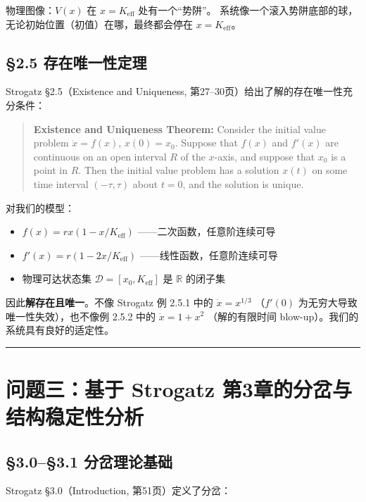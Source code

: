 \documentclass[12pt,a4paper]{article}
\begin{document}
物理图像：$V(x)$ 在 $x = K_{\text{eff}}$ 处有一个``势阱''。
系统像一个滚入势阱底部的球，无论初始位置（初值）在哪，最终都会停在 $x = K_{\text{eff}}$。

\subsection{\S2.5 存在唯一性定理}

Strogatz \S2.5（Existence and Uniqueness, 第27--30页）给出了解的存在唯一性充分条件：

\begin{quote}
\small
\textbf{Existence and Uniqueness Theorem:} Consider the initial value problem $\dot{x} = f(x)$,
$x(0) = x_0$. Suppose that $f(x)$ and $f'(x)$ are continuous on an open interval $R$ of the
$x$-axis, and suppose that $x_0$ is a point in $R$. Then the initial value problem has a
solution $x(t)$ on some time interval $(-\tau, \tau)$ about $t = 0$, and the solution is unique.
\end{quote}

对我们的模型：
\begin{itemize}
  \item $f(x) = r x(1 - x/K_{\text{eff}})$ ——二次函数，任意阶连续可导
  \item $f'(x) = r(1 - 2x/K_{\text{eff}})$ ——线性函数，任意阶连续可导
  \item 物理可达状态集 $\mathcal{D} = [x_0, K_{\text{eff}}]$ 是 $\mathbb{R}$ 的闭子集
\end{itemize}

因此\textbf{解存在且唯一}。不像 Strogatz 例 2.5.1 中的 $\dot{x} = x^{1/3}$
（$f'(0)$ 为无穷大导致唯一性失效），也不像例 2.5.2 中的 $\dot{x} = 1 + x^2$
（解的有限时间 blow-up）。我们的系统具有良好的适定性。

\vspace{12pt}
\hrule
\vspace{12pt}

\section{问题三：基于 Strogatz 第3章的分岔与结构稳定性分析}

\subsection{\S3.0--\S3.1 分岔理论基础}

Strogatz \S3.0（Introduction, 第51页）定义了分岔：
\end{document}
